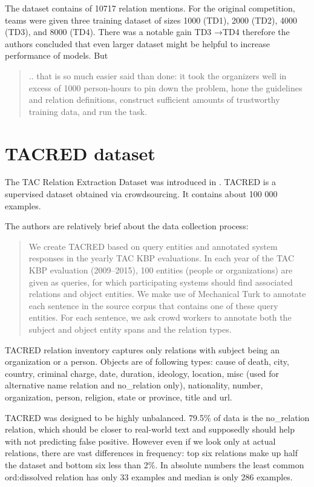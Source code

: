 The dataset contains of 10717 relation mentions. For the original competition, teams were given three training dataset of sizes 1000 (TD1), 2000 (TD2), 4000 (TD3), and 8000 (TD4). There was a notable gain TD3 →TD4 therefore the authors concluded that even larger dataset might be helpful to increase performance of models. But 

\begin{quotation}.. that is so much easier said than done: it took the organizers well in excess of 1000 person-hours to pin down the problem, hone the guidelines and
relation definitions, construct sufficient amounts of trustworthy training data, and run the task.
\end{quotation}




\section{TACRED dataset}
The TAC Relation Extraction Dataset was introduced in \cite{zhang2017tacred}. TACRED is a supervised dataset obtained via crowdsourcing. It contains about 100 000 examples. 

The authors are relatively brief about the data collection process:

\begin{quote}
We create TACRED based on query entities and annotated system responses in the yearly TAC KBP evaluations. In each year of the TAC KBP evaluation (2009–2015), 100 entities (people or organizations) are given as queries, for which participating systems should find associated relations and object entities. We make use of Mechanical Turk to annotate each sentence in the source corpus that contains one of these query entities. For each sentence, we ask crowd workers to annotate both the subject and object entity spans and the relation types.
\end{quote}

TACRED relation inventory captures only relations with subject being an organization or a person. Objects are of following types: cause of death, city, country, criminal charge, date, duration, ideology, location, misc (used for alternative name relation and no\_relation only), nationality, number, organization, person, religion, state or province, title and url.


TACRED was designed to be highly unbalanced. 79.5\% of data is the no\_relation relation, which should be closer to real-world text and supposedly should help with not predicting false positive. However even if we look only at actual relations, there are vast differences in frequency: top six relations make up half the dataset and bottom six less than 2\%. In absolute numbers the least common ord:dissolved relation has only 33 examples and median is only 286 examples.
 


